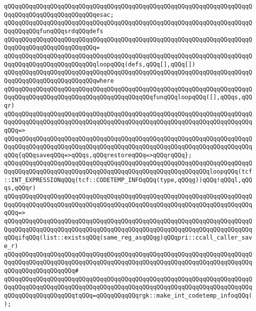 \verb|qQQqqQQqqQQqqQQqqQQqqQQqqQQqqQQqqQQqqQQqqQQqqQQqqQQqqQQqqQQqqQQqqQQqqQQqqQQqqQQqqQQqqQQqqQQqqQQqesac;|\newline
\newline
\verb|qQQqqQQqqQQqqQQqqQQqqQQqqQQqqQQqqQQqqQQqqQQqqQQqqQQqqQQqqQQqqQQqqQQqqQQqqQQqqQQqfunqQQqsrdqQQqdefs|\newline
\verb|qQQqqQQqqQQqqQQqqQQqqQQqqQQqqQQqqQQqqQQqqQQqqQQqqQQqqQQqqQQqqQQqqQQqqQQqqQQqqQQqqQQqqQQqqQQqqQQq=|\newline
\verb|qQQqqQQqqQQqqQQqqQQqqQQqqQQqqQQqqQQqqQQqqQQqqQQqqQQqqQQqqQQqqQQqqQQqqQQqqQQqqQQqqQQqqQQqqQQqqQQqloopqQQq(defs,qQQq[],qQQq[])|\newline
\verb|qQQqqQQqqQQqqQQqqQQqqQQqqQQqqQQqqQQqqQQqqQQqqQQqqQQqqQQqqQQqqQQqqQQqqQQqqQQqqQQqqQQqqQQqqQQqqQQqwhere|\newline
\verb|qQQqqQQqqQQqqQQqqQQqqQQqqQQqqQQqqQQqqQQqqQQqqQQqqQQqqQQqqQQqqQQqqQQqqQQqqQQqqQQqqQQqqQQqqQQqqQQqqQQqqQQqqQQqqQQqfunqQQqloopqQQq([],qQQqs,qQQqr)|\newline
\verb|qQQqqQQqqQQqqQQqqQQqqQQqqQQqqQQqqQQqqQQqqQQqqQQqqQQqqQQqqQQqqQQqqQQqqQQqqQQqqQQqqQQqqQQqqQQqqQQqqQQqqQQqqQQqqQQqqQQqqQQqqQQqqQQqqQQqqQQqqQQqqQQq=>|\newline
\verb|qQQqqQQqqQQqqQQqqQQqqQQqqQQqqQQqqQQqqQQqqQQqqQQqqQQqqQQqqQQqqQQqqQQqqQQqqQQqqQQqqQQqqQQqqQQqqQQqqQQqqQQqqQQqqQQqqQQqqQQqqQQqqQQqqQQqqQQqqQQqqQQq{qQQqsaveqQQq=>qQQqs,qQQqrestoreqQQq=>qQQqrqQQq};|\newline
\newline
\verb|qQQqqQQqqQQqqQQqqQQqqQQqqQQqqQQqqQQqqQQqqQQqqQQqqQQqqQQqqQQqqQQqqQQqqQQqqQQqqQQqqQQqqQQqqQQqqQQqqQQqqQQqqQQqqQQqqQQqqQQqqQQqqQQqloopqQQq(tcf::INT_EXPRESSIONqQQq(tcf::CODETEMP_INFOqQQq(type,qQQqg))qQQq!qQQql,qQQqs,qQQqr)|\newline
\verb|qQQqqQQqqQQqqQQqqQQqqQQqqQQqqQQqqQQqqQQqqQQqqQQqqQQqqQQqqQQqqQQqqQQqqQQqqQQqqQQqqQQqqQQqqQQqqQQqqQQqqQQqqQQqqQQqqQQqqQQqqQQqqQQqqQQqqQQqqQQqqQQq=>|\newline
\verb|qQQqqQQqqQQqqQQqqQQqqQQqqQQqqQQqqQQqqQQqqQQqqQQqqQQqqQQqqQQqqQQqqQQqqQQqqQQqqQQqqQQqqQQqqQQqqQQqqQQqqQQqqQQqqQQqqQQqqQQqqQQqqQQqqQQqqQQqqQQqqQQqifqQQq(list::existsqQQq(same_reg_asqQQqg)qQQqpri::ccall_caller_save_r)|\newline
\verb|qQQqqQQqqQQqqQQqqQQqqQQqqQQqqQQqqQQqqQQqqQQqqQQqqQQqqQQqqQQqqQQqqQQqqQQqqQQqqQQqqQQqqQQqqQQqqQQqqQQqqQQqqQQqqQQqqQQqqQQqqQQqqQQqqQQqqQQqqQQqqQQqqQQqqQQqqQQqqQQq#|\newline
\verb|qQQqqQQqqQQqqQQqqQQqqQQqqQQqqQQqqQQqqQQqqQQqqQQqqQQqqQQqqQQqqQQqqQQqqQQqqQQqqQQqqQQqqQQqqQQqqQQqqQQqqQQqqQQqqQQqqQQqqQQqqQQqqQQqqQQqqQQqqQQqqQQqqQQqqQQqqQQqqQQqtqQQq=qQQqqQQqqQQqrgk::make_int_codetemp_infoqQQq();|\newline
